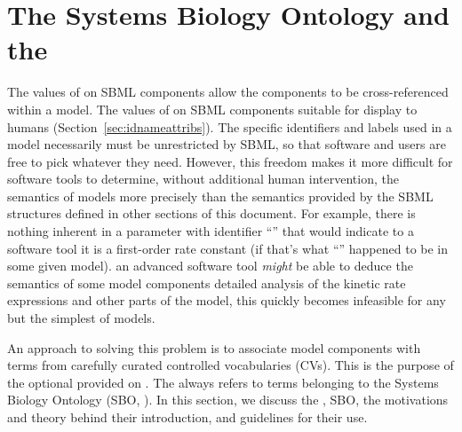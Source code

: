 
\section{The Systems Biology Ontology and the  }
\label{sec:sboTerm}
\label{sec:sbo}

The values of   on SBML components
allow the components to be cross-referenced within a model. The
values of   on SBML components
suitable for display to humans
(Section~\ref{sec:idnameattribs}).  The specific identifiers and
labels used in a model necessarily must be unrestricted by SBML,
so that software and users are free to pick whatever they need.
However, this freedom makes it more difficult for software tools
to determine, without additional human intervention, the semantics
of models more precisely than the semantics provided by the SBML
structures defined in other sections of this document.  For
example, there is nothing inherent in a parameter with identifier
``'' that would indicate to a software tool it is a
first-order rate constant (if that's what ``'' happened
to be in some given model).  
   an advanced software
tool \emph{might} be able to deduce the semantics of some model
components  detailed analysis of the kinetic rate expressions
and other parts of the model, this quickly becomes infeasible for
any but the simplest of models.

An approach to solving this problem is to associate model
components with terms from carefully curated controlled
vocabularies (CVs).  This is the purpose of the optional
  provided on 
.  The   always refers to
terms belonging to the Systems Biology Ontology (SBO, \sboref). In
this section, we discuss the  ,
SBO, the motivations and theory behind their introduction, and
guidelines for their use.

